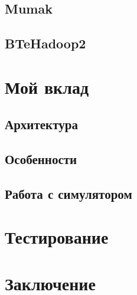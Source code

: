 \documentclass[a4paper,12pt]{article}
\begin{document}
    \subsection{Mumak}

    \subsection{BTeHadoop2}

    \newpage

    \section{Мой вклад}

    \subsection{Архитектура}

    \subsection{Особенности}

    \subsection{Работа с симулятором}

    \newpage

    \section{Тестирование}

    \newpage

    \section{Заключение}

    \newpage

    \printbibliography
\end{document}
